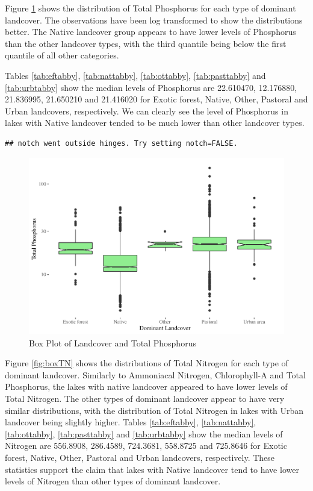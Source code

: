 \documentclass[
]{article}
\begin{document}
Figure \ref{fig:boxTP} shows the distribution of Total Phosphorus for each type of dominant landcover. The observations have been log transformed to show the distributions better. The Native landcover group appears to have lower levels of Phosphorus than the other landcover types, with the third quantile being below the first quantile of all other categories.

Tables \ref{tab:eftabby}, \ref{tab:nattabby}, \ref{tab:ottabby}, \ref{tab:pasttabby} and \ref{tab:urbtabby} show the median levels of Phosphorus are 22.610470, 12.176880, 21.836995, 21.650210 and 21.416020 for Exotic forest, Native, Other, Pastoral and Urban landcovers, respectively. We can clearly see the level of Phosphorus in lakes with Native landcover tended to be much lower than other landcover types.

\begin{verbatim}
## notch went outside hinges. Try setting notch=FALSE.
\end{verbatim}

\begin{figure}
\centering
\includegraphics{Final-Report_files/figure-latex/boxTP-1.pdf}
\caption{\label{fig:boxTP}Box Plot of Landcover and Total Phosphorus}
\end{figure}

Figure \ref{fig:boxTN} shows the distributions of Total Nitrogen for each type of dominant landcover. Similarly to Ammoniacal Nitrogen, Chlorophyll-A and Total Phosphorus, the lakes with native landcover appeared to have lower levels of Total Nitrogen. The other types of dominant landcover appear to have very similar distributions, with the distribution of Total Nitrogen in lakes with Urban landcover being slightly higher. Tables \ref{tab:eftabby}, \ref{tab:nattabby}, \ref{tab:ottabby}, \ref{tab:pasttabby} and \ref{tab:urbtabby} show the median levels of Nitrogen are 556.8908, 286.4589, 724.3681, 558.8725 and 725.8646 for Exotic forest, Native, Other, Pastoral and Urban landcovers, respectively. These statistics support the claim that lakes with Native landcover tend to have lower levels of Nitrogen than other types of dominant landcover.
\end{document}
